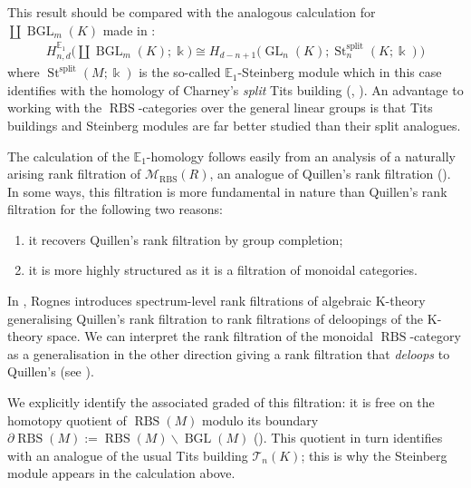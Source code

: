 \documentclass[12pt, reqno]{amsart}
\theoremstyle{plain}
\theoremstyle{definition}
\begin{document}
This result should be compared with the analogous calculation for $\coprod \operatorname{BGL}_m(K)$ made in \cite[\S 17.2]{GalatiusKupersRandalWilliams}:
\begin{align*}
H^{\mathbb{E}_1}_{n,d}\Big(\coprod \operatorname{BGL}_m(K);\Bbbk\Big)\cong H_{d-n+1}\big(\operatorname{GL}_n(K); \operatorname{St}^{\operatorname{split}}_n(K;\Bbbk)\big)
\end{align*}
where $\operatorname{St}^{\operatorname{split}}(M;\Bbbk)$ is the so-called $\mathbb{E}_1$-Steinberg module which in this case identifies with the homology of Charney's \textit{split} Tits building (\cite{Charney80}, \cite[\S 18.2]{GalatiusKupersRandalWilliams}). An advantage to working with the $\operatorname{RBS}$-categories over the general linear groups is that Tits buildings and Steinberg modules are far better studied than their split analogues.

The calculation of the $\mathbb{E}_1$-homology follows easily from an analysis of a naturally arising rank filtration of $\mathscr{M}_{\operatorname{RBS}}(R)$, an analogue of Quillen's rank filtration (\cite{Quillen73a}). In some ways, this filtration is more fundamental in nature than Quillen's rank filtration for the following two reasons:
\begin{enumerate}
\item it recovers Quillen's rank filtration by group completion;
\item it is more highly structured as it is a filtration of monoidal categories.
\end{enumerate}
In \cite{Rognes}, Rognes introduces spectrum-level rank filtrations of algebraic K-theory generalising Quillen's rank filtration to rank filtrations of deloopings of the K-theory space. We can interpret the rank filtration of the monoidal $\operatorname{RBS}$-category as a generalisation in the other direction giving a rank filtration that \textit{deloops} to Quillen's (see ).

We explicitly identify the associated graded of this filtration: it is free on the homotopy quotient of $\operatorname{RBS}(M)$ modulo its boundary $\partial \operatorname{RBS}(M):=\operatorname{RBS}(M)\smallsetminus \operatorname{BGL}(M)$ (). This quotient in turn identifies with an analogue of the usual Tits building $\mathcal{T}_n(K)$; this is why the Steinberg module appears in the calculation above.

\medskip
\end{document}
